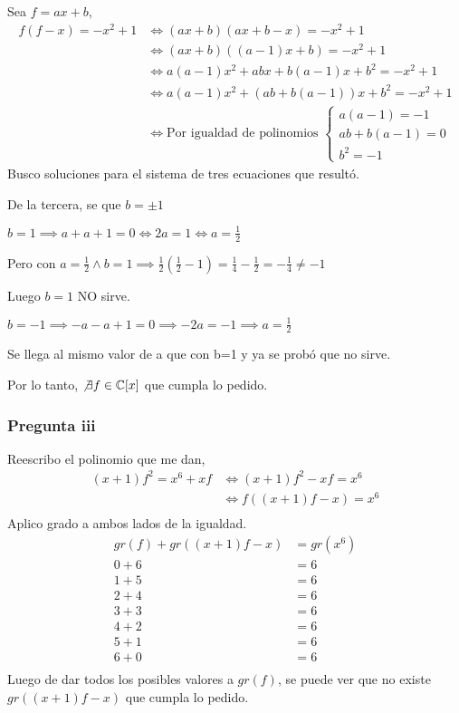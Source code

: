 Sea $ f = ax+b $,
\begin{align*}
    f(f-x) = -x^2 + 1 &\iff (ax+b)(ax+b-x) = -x^2+1 \\
    &\iff (ax+b)((a-1)x+b) = -x^2+1 \\
    &\iff a(a-1)x^2 + abx + b(a-1)x + b^2 = -x^2+1 \\
    &\iff a(a-1)x^2 + (ab+b(a-1))x + b^2 = -x^2+1 \\
    &\iff \text{Por igualdad de polinomios }\begin{cases}
        a(a-1) = -1 \\
        ab+b(a-1) = 0 \\
        b^2 = -1 
    \end{cases}
\end{align*}
Busco soluciones para el sistema de tres ecuaciones que resultó.

De la tercera, se que $ b = \pm 1 $

$ b = 1 \implies a + a + 1 = 0 \iff 2a = 1 \iff a = \frac{1}{2} $

Pero con $ a = \frac{1}{2} \wedge b= 1 \implies \frac{1}{2} (\frac{1}{2}-1) = \frac{1}{4} - \frac{1}{2} = -\frac{1}{4} \neq -1 $

Luego $ b = 1 $ NO sirve.

$ b = -1 \implies -a-a+1 = 0 \implies -2a = -1 \implies a = \frac{1}{2} $

Se llega al mismo valor de a que con b=1 y ya se probó que no sirve.

Por lo tanto, $ \not \exists f \in \mathbb{C}[x] $ que cumpla lo pedido.

\subsubsection{Pregunta iii}

Reescribo el polinomio que me dan,
\begin{align*}
    (x+1)f^2 = x^6 + xf &\iff (x+1)f^2 - xf = x^6 \\
    &\iff f((x+1)f - x) = x^6 \\
\end{align*}
Aplico grado a ambos lados de la igualdad.
\begin{align*}
    gr(f) + gr((x+1)f - x) &= gr(x^6) \\
    0 + 6 &= 6 \\
    1 + 5 &= 6 \\
    2 + 4 &= 6 \\
    3 + 3 &= 6 \\
    4 + 2 &= 6 \\
    5 + 1 &= 6 \\
    6 + 0 &= 6 \\
\end{align*}
Luego de dar todos los posibles valores a $ gr(f) $, se puede ver que no existe $ gr((x+1)f - x) $ que cumpla lo pedido.

